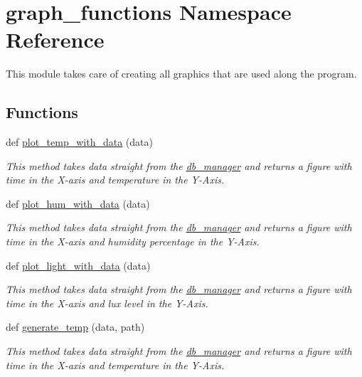 \hypertarget{namespacegraph__functions}{}\section{graph\+\_\+functions Namespace Reference}
\label{namespacegraph__functions}


This module takes care of creating all graphics that are used along the program.  


\subsection*{Functions}
\begin{DoxyCompactItemize}
\item 
def \hyperlink{namespacegraph__functions_a9d595169f9bb4cb9f6d8b9d2cd4ebc34}{plot\+\_\+temp\+\_\+with\+\_\+data} (data)
\begin{DoxyCompactList}\small\item\em This method takes data straight from the \textquotesingle{}\hyperlink{namespacedb__manager}{db\+\_\+manager}\textquotesingle{} and returns a figure with time in the X-\/axis and temperature in the Y-\/\+Axis. \end{DoxyCompactList}\item 
def \hyperlink{namespacegraph__functions_ad259f0d25aaeea64fa4715826511cacc}{plot\+\_\+hum\+\_\+with\+\_\+data} (data)
\begin{DoxyCompactList}\small\item\em This method takes data straight from the \textquotesingle{}\hyperlink{namespacedb__manager}{db\+\_\+manager}\textquotesingle{} and returns a figure with time in the X-\/axis and humidity percentage in the Y-\/\+Axis. \end{DoxyCompactList}\item 
def \hyperlink{namespacegraph__functions_a04abf299e8d2fc1d54f6fc7ec5b73ed0}{plot\+\_\+light\+\_\+with\+\_\+data} (data)
\begin{DoxyCompactList}\small\item\em This method takes data straight from the \textquotesingle{}\hyperlink{namespacedb__manager}{db\+\_\+manager}\textquotesingle{} and returns a figure with time in the X-\/axis and lux level in the Y-\/\+Axis. \end{DoxyCompactList}\item 
def \hyperlink{namespacegraph__functions_af59a4f9c95f5173f003a7f8daf772e4c}{generate\+\_\+temp} (data, path)
\begin{DoxyCompactList}\small\item\em This method takes data straight from the \textquotesingle{}\hyperlink{namespacedb__manager}{db\+\_\+manager}\textquotesingle{} and returns a figure with time in the X-\/axis and temperature in the Y-\/\+Axis. \end{DoxyCompactList}\item 

\end{DoxyCompactItemize}
